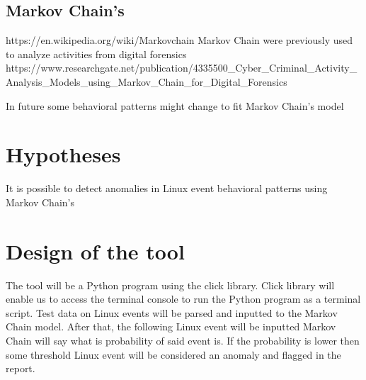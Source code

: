 \documentclass{VUMIFPSmagistrinis}
\begin{document}
    \subsection{Markov Chain's}
        https://en.wikipedia.org/wiki/Markov\textunderscore chain
        Markov Chain were previously used to analyze activities from digital forensics https://www.researchgate.net/publication/4335500_Cyber_Criminal_Activity_Analysis_Models_using_Markov_Chain_for_Digital_Forensics

        In future some behavioral patterns might change to fit Markov Chain's model

	
\section{Hypotheses}
    It is possible to detect anomalies in Linux event behavioral patterns using Markov Chain's
	
\section{Design of the tool}
    The tool will be a Python program using the click library. 
    Click library will enable us to access the terminal console to run the Python program as a terminal script.
    Test data on Linux events will be parsed and inputted to the Markov Chain model.
    After that, the following Linux event will be inputted Markov Chain will say what is probability of said event is.
    If the probability is lower then some threshold Linux event will be considered an anomaly and flagged in the report.
    
\end{document}
